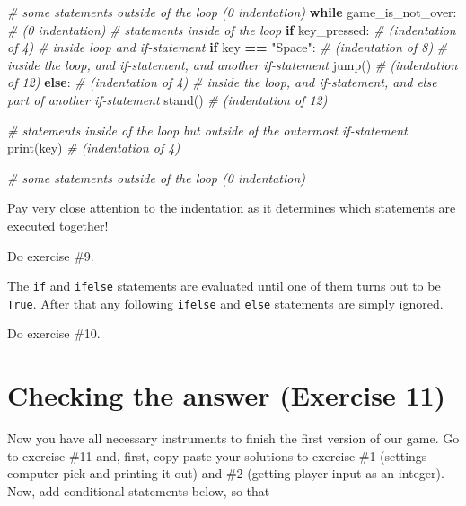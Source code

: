 \documentclass[
]{book}
\newenvironment{Shaded}{\begin{snugshade}}{\end{snugshade}}
\newcommand{\BuiltInTok}[1]{#1}
\newcommand{\CommentTok}[1]{\textcolor[rgb]{0.56,0.35,0.01}{\textit{#1}}}
\newcommand{\ControlFlowTok}[1]{\textcolor[rgb]{0.13,0.29,0.53}{\textbf{#1}}}
\newcommand{\NormalTok}[1]{#1}
\newcommand{\OperatorTok}[1]{\textcolor[rgb]{0.81,0.36,0.00}{\textbf{#1}}}
\newcommand{\StringTok}[1]{\textcolor[rgb]{0.31,0.60,0.02}{#1}}
\begin{document}
\begin{Shaded}
\begin{Highlighting}[]
\CommentTok{\# some statements outside of the loop (0 indentation)}
\ControlFlowTok{while}\NormalTok{ game\_is\_not\_over: }\CommentTok{\# (0 indentation)}
    \CommentTok{\# statements inside of the loop }
    \ControlFlowTok{if}\NormalTok{ key\_pressed: }\CommentTok{\# (indentation of 4)}
        \CommentTok{\# inside loop and if{-}statement }
        \ControlFlowTok{if}\NormalTok{ key }\OperatorTok{==} \StringTok{"Space"}\NormalTok{: }\CommentTok{\# (indentation of 8)}
            \CommentTok{\# inside the loop, and if{-}statement, and another if{-}statement}
\NormalTok{            jump() }\CommentTok{\# (indentation of 12)}
        \ControlFlowTok{else}\NormalTok{: }\CommentTok{\# (indentation of 4)}
            \CommentTok{\# inside the loop, and if{-}statement, and else part of another if{-}statement}
\NormalTok{            stand() }\CommentTok{\# (indentation of 12)}
    
    \CommentTok{\# statements inside of the loop but outside of the outermost if{-}statement}
    \BuiltInTok{print}\NormalTok{(key) }\CommentTok{\# (indentation of 4)}
    
\CommentTok{\# some statements outside of the loop (0 indentation)}
\end{Highlighting}
\end{Shaded}

Pay very close attention to the indentation as it determines which statements are executed together!

Do exercise \#9.

The \texttt{if} and \texttt{ifelse} statements are evaluated until one of them turns out to be \texttt{True}. After that any following \texttt{ifelse} and \texttt{else} statements are simply ignored.

Do exercise \#10.

\hypertarget{checking-the-answer-exercise-11}{%
\section{Checking the answer (Exercise 11)}\label{checking-the-answer-exercise-11}}

Now you have all necessary instruments to finish the first version of our game. Go to exercise \#11 and, first, copy-paste your solutions to exercise \#1 (settings computer pick and printing it out) and \#2 (getting player input as an integer). Now, add conditional statements below, so that
\end{document}
